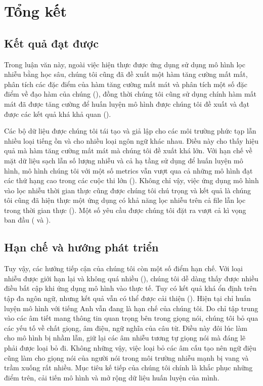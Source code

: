 \newcommand{\finimg}[1]{parts/final/img/#1}
\setupfont{13pt}

\chapter{Tổng kết}\label{chapter::final}

\section{Kết quả đạt được}
	
	Trong luận văn này, ngoài việc hiện thực được ứng dụng sử dụng mô hình lọc nhiễu bằng học sâu, chúng tôi cũng đã đề xuất một hàm tăng cường mất mất, phân tích các đặc điểm của hàm tăng cường mất mát và phân tích một số đặc điểm về đạo hàm của chúng (), đồng thời chúng tôi cũng sử dụng chính hàm mất mát đã được tăng cường để huấn luyện mô hình được chúng tôi đề xuất và đạt được các kết quả khá khả quan ().
	
	Các bộ dữ liệu được chúng tôi tái tạo và giả lập cho các môi trường phức tạp lẫn nhiều loại tiếng ồn và cho nhiều loại ngôn ngữ khác nhau. Điều này cho thấy hiệu quả mà hàm tăng cường mất mát mà chúng tôi đề xuất khá lớn. Với hạn chế về mặt dữ liệu sạch lẫn số lượng nhiễu và cả hạ tầng sử dụng để huấn luyện mô hình, mô hình chúng tôi với một số metrics vẫn vượt qua cả những mô hình đạt các thứ hạng cao trong các cuộc thi lớn (). Không chỉ vậy, việc ứng dụng mô hình vào lọc nhiễu thời gian thực cũng được chúng tôi chú trọng và kết quả là chúng tôi cũng đã hiện thực một ứng dụng có khả năng lọc nhiễu trên cả file lẫn lọc trong thời gian thực (). Một số yêu cầu được chúng tôi đặt ra vượt cả kì vọng ban đầu ( và ).
	
	
\section{Hạn chế và hướng phát triển}

	Tuy vậy, các hướng tiếp cận của chúng tôi còn một số điểm hạn chế. Với loại nhiễu được giới hạn lại và không quá nhiều (), chúng tôi dễ dàng thấy được nhiều điều bất cập khi ứng dụng mô hình vào thực tế. Tuy có kết quả khá ổn định trên tập đa ngôn ngữ, nhưng kết quả vẫn có thể được cải thiện (). Hiện tại chỉ huấn luyện mô hình với tiếng Anh vẫn đang là hạn chế của chúng tôi. Do chỉ tập trung vào các âm tiết mang thông tin quan trọng bên trong giọng nói, chúng tôi bỏ qua các yếu tố về chất giọng, âm điệu, ngữ nghĩa của câu từ. Điều này đôi lúc làm cho mô hình bị nhầm lẫn, giữ lại các âm nhiễu tương tự giọng nói mà đáng lẽ phải được loại bỏ đi. Không những vậy, việc loại bỏ các âm cấu tạo nên ngữ điệu cũng làm cho giọng nói của người nói trong môi trường nhiễu mạnh bị vang và trầm xuống rất nhiều. Mục tiêu kế tiếp của chúng tôi chính là khắc phục những điểm trên, cải tiến mô hình và mở rộng dữ liệu huấn luyện của mình.
	
